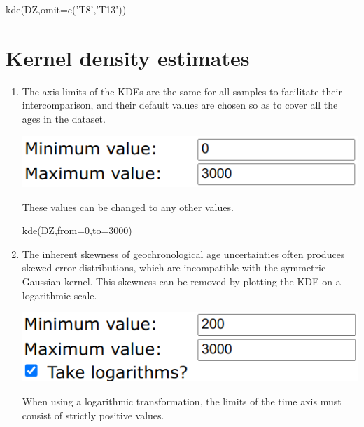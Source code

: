 \begin{refsection}
\begin{console}
kde(DZ,omit=c('T8','T13'))
\end{console}

\section{Kernel density estimates}

\begin{enumerate}
  
\item The axis limits of the KDEs are the same for all samples to
  facilitate their intercomparison, and their default values are
  chosen so as to cover all the ages in the dataset.

  \noindent\begin{minipage}[t]{.4\linewidth}
\strut\vspace*{-\baselineskip}\newline
\includegraphics[width=\linewidth]{../figures/detritalKDElimits.png}
\end{minipage}
\begin{minipage}[t]{.6\linewidth}
These values can be changed to any other values.
\end{minipage}

\begin{console}
kde(DZ,from=0,to=3000)
\end{console}

\item The inherent skewness of geochronological age uncertainties
  often produces skewed error distributions, which are incompatible
  with the symmetric Gaussian kernel. This skewness can be removed by
  plotting the KDE on a logarithmic scale.

  \noindent\begin{minipage}[t]{.4\linewidth}
\strut\vspace*{-\baselineskip}\newline
\includegraphics[width=\linewidth]{../figures/detritalKDElogscale.png}
\end{minipage}
\begin{minipage}[t]{.6\linewidth}
  When using a logarithmic transformation, the limits of the time axis
  must consist of strictly positive values.
\end{minipage}


\end{enumerate}
\end{refsection}
